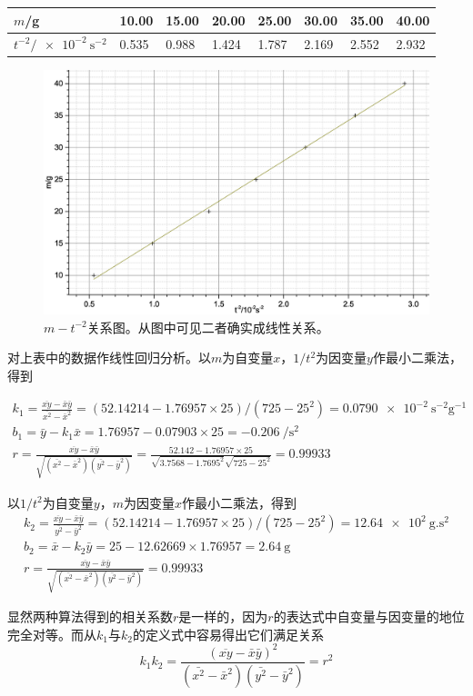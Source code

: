 \documentclass[UTF8]{ctexart}
\begin{document}
\subsection{}
\noindent
\begin{tabu} to \linewidth {X[2]|X X X X X X X}
\hline
$m$/g&10.00&15.00&20.00&25.00&30.00&35.00&40.00\\
\hline
$t^{-2}/\SI{e-2}{\second^{-2}}$&0.535 &0.988 &1.424 &1.787 &2.169 &2.552 &2.932\\
\hline
\end{tabu}
\begin{figure}[h]
  \includegraphics[width=\linewidth,keepaspectratio=true]{m-t.eps}
  \caption{$m-t^{-2}$关系图。从图中可见二者确实成线性关系。}
\end{figure}

对上表中的数据作线性回归分析。以$m$为自变量$x$，$1/t^2$为因变量$y$作最小二乘法，得到

\begin{gather}
  k_1= \frac{\overline{xy}-\bar{x}\bar{y}}{\bar{x^2}-\bar{x}^2}=(52.14214-1.76957\times25)/(725-25^2)=\SI{0.0790e-2}{\second^{-2}\gram^{-1}}\\
  b_1= \bar{y}-k_1\bar{x}=1.76957-0.07903\times25=\SI{-0.206}{\per\second\squared}\\
  r=\frac{\overline{xy}-\bar{x}\bar{y}}{\sqrt{(\bar{x^2}-\bar{x}^2)(\bar{y^2}-\bar{y}^2)}}=\frac{52.142-1.76957\times25}{\sqrt{3.7568-1.7695^2}\sqrt{725-25^2}}=0.99933
\end{gather}

以$1/t^2$为自变量$y$，$m$为因变量$x$作最小二乘法，得到
\begin{gather}
  k_2= \frac{\overline{xy}-\bar{x}\bar{y}}{\bar{y^2}-\bar{y}^2}=(52.14214-1.76957\times25)/(725-25^2)=\SI{12.64e2}{\gram.\second^2}\\
  b_2= \bar{x}-k_2\bar{y}=25-12.62669\times1.76957=\SI{2.64}{\gram}\\
  r=\frac{\overline{xy}-\bar{x}\bar{y}}{\sqrt{(\bar{x^2}-\bar{x}^2)(\bar{y^2}-\bar{y}^2)}}=0.99933
\end{gather}

显然两种算法得到的相关系数$r$是一样的，因为$r$的表达式中自变量与因变量的地位完全对等。而从$k_1$与$k_2$的定义式中容易得出它们满足关系
\begin{equation}
k_1k_2=\frac{(\overline{xy}-\bar{x}\bar{y})^2} {(\bar{x^2}-\bar{x}^2)(\bar{y^2}-\bar{y}^2)}=r^2
\end{equation}
\end{document}
